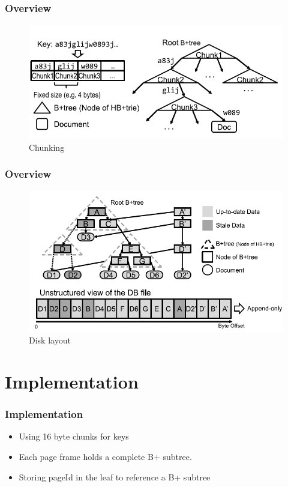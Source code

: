 \documentclass[aspectratio=169]{beamer}
\begin{document}
\begin{frame}[t]
	\frametitle{Overview}
	\begin{figure}[h!]
		\includegraphics[scale=0.7]{logical_layout}
		\caption{Chunking}
	\end{figure}
	\centering	
\end{frame}
\begin{frame}[t]
	\frametitle{Overview}
	\begin{figure}[h!]
		\includegraphics[scale=0.5]{disk_layout}
		\caption{Disk layout}
	\end{figure}
	\centering	
\end{frame}
\section{Implementation}
\begin{frame}[t]
    \frametitle{Implementation}
    \begin{itemize}
    	\item Using 16 byte chunks for keys
    	\item Each page frame holds a complete B+ subtree.
    	\item Storing pageId in the leaf to reference a B+ subtree
    \end{itemize}
\end{frame}
\end{document}
